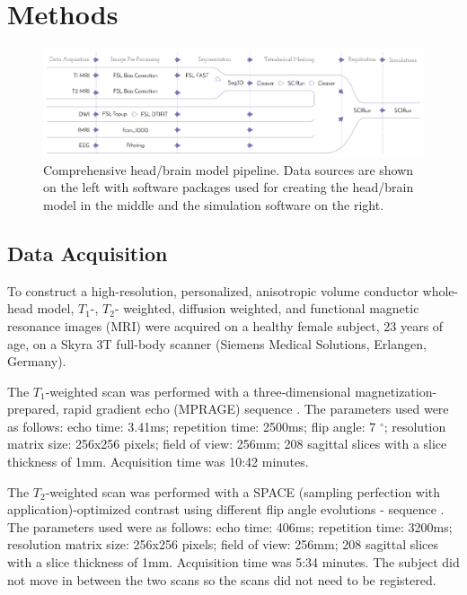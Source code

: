 
\section{Methods}
\label{sec:Methods}



\begin{figure}[H]
    \centering
    \includegraphics[width=\textwidth]{Figures/pipeline}
    \caption{Comprehensive head/brain model pipeline. Data sources are shown on the left with software packages used for creating the head/brain model in the middle and the simulation software on the right.}
    \label{fig:pipeline}
\end{figure}

\subsection{Data Acquisition}
\label{sec:Data}


To construct a high-resolution, personalized, anisotropic volume conductor whole-head model, $T_1$-, $T_2$- weighted, diffusion weighted, and functional magnetic resonance images (MRI) were acquired on a healthy female subject, 23 years of age, on a Skyra 3T full-body scanner (Siemens Medical Solutions, Erlangen, Germany).

The $T_1$-weighted scan was performed with a three-dimensional magnetization-prepared, rapid gradient echo (MPRAGE) sequence \cite{ref:mprage}. The parameters used were as follows: echo time: 3.41ms; repetition time: 2500ms; flip angle: 7 $^{\circ}$; resolution matrix size: 256x256 pixels; field of view: 256mm; 208 sagittal slices with a slice thickness of 1mm. Acquisition time was 10:42 minutes.

The $T_2$-weighted scan was performed with a SPACE (sampling perfection with application)-optimized contrast using different flip angle evolutions - sequence \cite{ref:space}. The parameters used were as follows: echo time: 406ms; repetition time: 3200ms; resolution matrix size: 256x256 pixels; field of view: 256mm; 208 sagittal slices with a slice thickness of 1mm. Acquisition time was 5:34 minutes. The subject did not move in between the two scans so the scans did not need to be registered.

